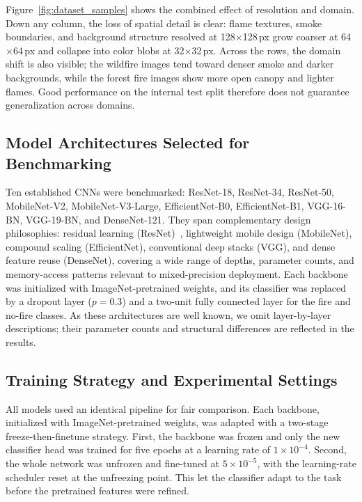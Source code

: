 \documentclass[conference]{IEEEtran}
\begin{document}
Figure~\ref{fig:dataset_samples} shows the combined effect of resolution and domain. Down any column, the loss of spatial detail is clear: flame textures, smoke boundaries, and background structure resolved at 128$\times$128\,px grow coarser at 64$\times$64\,px and collapse into color blobs at 32$\times$32\,px. Across the rows, the domain shift is also visible; the wildfire images tend toward denser smoke and darker backgrounds, while the forest fire images show more open canopy and lighter flames. Good performance on the internal test split therefore does not guarantee generalization across domains.

\subsection{Model Architectures Selected for Benchmarking}

Ten established CNNs were benchmarked: ResNet-18, ResNet-34, ResNet-50, MobileNet-V2, MobileNet-V3-Large, EfficientNet-B0, EfficientNet-B1, VGG-16-BN, VGG-19-BN, and DenseNet-121. They span complementary design philosophies: residual learning (ResNet)~\cite{he2016deep}, lightweight mobile design (MobileNet), compound scaling (EfficientNet), conventional deep stacks (VGG), and dense feature reuse (DenseNet), covering a wide range of depths, parameter counts, and memory-access patterns relevant to mixed-precision deployment. Each backbone was initialized with ImageNet-pretrained weights, and its classifier was replaced by a dropout layer ($p=0.3$) and a two-unit fully connected layer for the fire and no-fire classes. As these architectures are well known, we omit layer-by-layer descriptions; their parameter counts and structural differences are reflected in the results.

\subsection{Training Strategy and Experimental Settings}

All models used an identical pipeline for fair comparison. Each backbone, initialized with ImageNet-pretrained weights, was adapted with a two-stage freeze-then-finetune strategy. First, the backbone was frozen and only the new classifier head was trained for five epochs at a learning rate of $1\times10^{-4}$. Second, the whole network was unfrozen and fine-tuned at $5\times10^{-5}$, with the learning-rate scheduler reset at the unfreezing point. This let the classifier adapt to the task before the pretrained features were refined.
\end{document}
